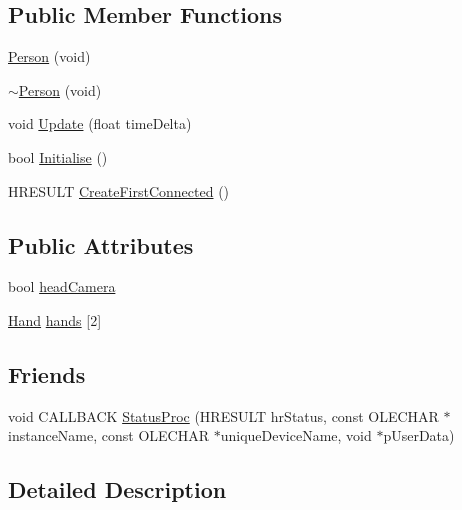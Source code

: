\subsection*{Public Member Functions}
\begin{DoxyCompactItemize}
\item 
\hyperlink{class_b_g_e_1_1_person_a5cb526e345f860d698522e2d60b33fde}{Person} (void)
\item 
\hyperlink{class_b_g_e_1_1_person_a8a536766d5e4fbe526bbe26ce9cff0b0}{$\sim$\-Person} (void)
\item 
void \hyperlink{class_b_g_e_1_1_person_a7e4ef969e4b0059d3bd7408a5bc7b1ea}{Update} (float time\-Delta)
\item 
bool \hyperlink{class_b_g_e_1_1_person_adfe923aca1bf03b2babc709ef57a8e08}{Initialise} ()
\item 
H\-R\-E\-S\-U\-L\-T \hyperlink{class_b_g_e_1_1_person_a6e6d2bcd90567cd5b65168922b89999b}{Create\-First\-Connected} ()
\end{DoxyCompactItemize}
\subsection*{Public Attributes}
\begin{DoxyCompactItemize}
\item 
bool \hyperlink{class_b_g_e_1_1_person_aa6a0af6c187ab6e33f70e61a9a2e2734}{head\-Camera}
\item 
\hyperlink{struct_b_g_e_1_1_hand}{Hand} \hyperlink{class_b_g_e_1_1_person_ad510584a4d8c764933651d4dd8934890}{hands} \mbox{[}2\mbox{]}
\end{DoxyCompactItemize}
\subsection*{Friends}
\begin{DoxyCompactItemize}
\item 
void C\-A\-L\-L\-B\-A\-C\-K \hyperlink{class_b_g_e_1_1_person_a92bd214d5ff2aaf2f6a6d4fd27de5ea9}{Status\-Proc} (H\-R\-E\-S\-U\-L\-T hr\-Status, const O\-L\-E\-C\-H\-A\-R $\ast$instance\-Name, const O\-L\-E\-C\-H\-A\-R $\ast$unique\-Device\-Name, void $\ast$p\-User\-Data)
\end{DoxyCompactItemize}


\subsection{Detailed Description}


